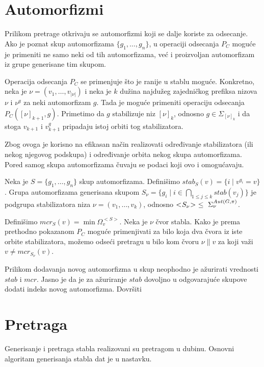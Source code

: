 \documentclass[12pt,oneside]{memoir}
\theoremstyle{definition}
\begin{document}
 \section{Automorfizmi}

  Prilikom pretrage otkrivaju se automorfizmi koji se dalje koriste za
  odsecanje. Ako je poznat skup automorfizama $\{g_1, \dots, g_n\}$, u
  operaciji odsecanja $P_C$ moguće je primeniti ne samo neki od tih
  automorfizama, već i proizvoljan automorfizam iz grupe generisane tim skupom.
  
  Operacija odsecanja $P_C$ se primenjuje što je ranije u stablu moguće.
  Konkretno, neka je $\nu = (v_1, \dots, v_{|\nu|})$ i neka je $k$ dužina
  najdužeg zajedničkog prefiksa nizova $\nu$ i $\nu^g$ za neki automorfizam
  $g$. Tada je moguće primeniti operaciju odsecanja $P_C([\nu]_{k+1}, g)$.
  Primetimo da $g$ stabilizuje niz $[\nu]_k$, odnosno $g \in \Sigma_{[\nu]_k}$
  i da stoga $v_{k+1}$ i $v_{k+1}^g$ pripadaju istoj orbiti tog stabilizatora.

  Zbog ovoga je korisno na efikasan način realizovati određivanje stabilizatora
  (ili nekog njegovog podskupa) i određivanje orbita nekog skupa automorfizama.
  Pored samog skupa automorfizama čuvaju se podaci koji ovo i omogućavaju.

  Neka je $S = \{g_1, \dots, g_n\}$ skup automorfizama. Definišimo $stab_S(v) =
  \{i \mid v^{g_i} = v\}$. Grupa automorfizama generisana skupom $S_\nu = \{g_i
  \mid i \in \bigcap_{1 \leq j \leq k} stab(v_j)\}$ je podgrupa stabilizatora
  niza $\nu = (v_1, \dots, v_k)$, odnosno $< \negmedspace S_\nu \negmedspace >
  \  \leq \  \Sigma^{Aut(G, \pi)}_\nu$.

  Definišimo $mcr_S(v) = \min \Omega_v^{< S >}$. Neka je $\nu$ čvor stabla.
  Kako je prema prethodno pokazanom $P_C$ moguće primenjivati za bilo koja dva
  čvora iz iste orbite stabilizatora, možemo odseći pretragu u bilo kom čvoru
  $\nu \| v$ za koji važi $v \neq mcr_{S_\nu}(v)$.

  Prilikom dodavanja novog automorfizma u skup neophodno je ažurirati vrednosti
  $stab$ i $mcr$. Jasno je da je za ažuriranje $stab$ dovoljno u odgovarajuće
  skupove dodati indeks novog automorfizma. {\color{red} Dovršiti}

 \section{Pretraga}

  Generisanje i pretraga stabla realizovani su pretragom u dubinu. Osnovni
  algoritam generisanja stabla dat je u nastavku.
\end{document}
